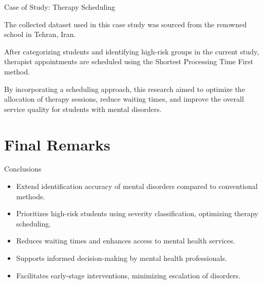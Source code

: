 \documentclass[10pt, xcolor=table]{beamer}
\let\olditem\item
\renewcommand\item{\olditem\justifying}
\begin{document}
\begin{frame}{Case of Study: Therapy Scheduling \cite{DEHGHANBONARI2023100238}}
	

\begin{tcolorbox}[width=\textwidth, colback=myNewColorB, colframe=myNewColorA, boxrule=0.7mm, rounded corners]
	The collected dataset used in this case study was sourced from the renowned school in Tehran, Iran.
\end{tcolorbox}

\vspace{0.3cm}

\begin{tcolorbox}[width=\textwidth, colback=myNewColorB, colframe=myNewColorA, boxrule=0.7mm, rounded corners]
	After categorizing students and identifying high-risk groups in the current study, therapist appointments are scheduled using the Shortest Processing Time First method.
\end{tcolorbox}

\vspace{0.3cm}

\begin{tcolorbox}[width=\textwidth, colback=myNewColorB, colframe=myNewColorA, boxrule=0.7mm, rounded corners]
	By incorporating a scheduling approach, this research aimed to optimize the allocation of therapy sessions, reduce waiting times, and improve the overall service quality for students with mental disorders.
\end{tcolorbox}
	
\end{frame}
	
	
\section*{Final Remarks}

\begin{frame}{Conclusions}
	
	\begin{tcolorbox}[width=\textwidth, colback=myNewColorB, colframe=myNewColorA, boxrule=0.7mm, rounded corners]
		\begin{itemize}
			\item Extend identification accuracy of mental disorders compared to conventional methods.
			\item Prioritizes high-risk students using severity classification, optimizing therapy scheduling.
			\item Reduces waiting times and enhances access to mental health services.
			\item Supports informed decision-making by mental health professionals.
			\item Facilitates early-stage interventions, minimizing escalation of disorders.
		\end{itemize}
	\end{tcolorbox}
	
\end{frame}
	
\end{document}
